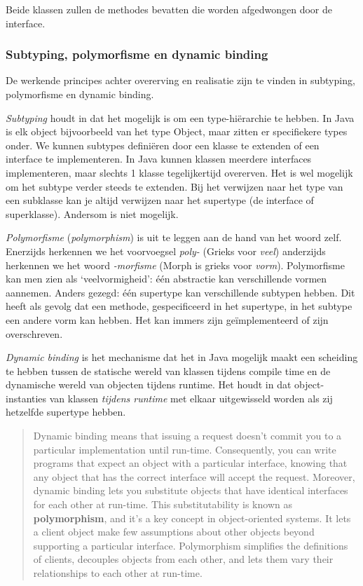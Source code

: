Beide klassen zullen de methodes bevatten die worden afgedwongen door de 
interface.

\subsubsection{Subtyping, polymorfisme en dynamic binding}
De werkende principes achter overerving en realisatie zijn te vinden in 
subtyping, polymorfisme en dynamic binding.

\textit{Subtyping} houdt in dat het mogelijk is om een type-hiërarchie te hebben.
In Java is elk object bijvoorbeeld van het type Object, maar zitten er specifiekere
types onder. We kunnen subtypes definiëren door een klasse te extenden of 
een interface te implementeren. In Java kunnen klassen meerdere interfaces implementeren, 
maar slechts 1 klasse tegelijkertijd overerven. Het is wel mogelijk om het subtype verder 
steeds te extenden. Bij het verwijzen naar het type van een subklasse kan je altijd 
verwijzen naar het supertype (de interface of superklasse). Andersom is niet mogelijk.

\textit{Polymorfisme} (\textit{polymorphism}) is uit te leggen 
aan de hand van het woord zelf. Enerzijds herkennen we
het voorvoegsel \textit{poly-} (Grieks voor \textit{veel})
anderzijds herkennen we het woord \textit{-morfisme} (Morph is grieks voor \textit{vorm}).
Polymorfisme kan men zien als `veelvormigheid': één abstractie kan verschillende vormen aannemen.
Anders gezegd: één supertype kan verschillende subtypen hebben.
Dit heeft als gevolg dat een methode, gespecificeerd in het supertype, 
in het subtype een andere vorm kan hebben. Het kan immers zijn geïmplementeerd of 
zijn overschreven.

\textit{Dynamic binding} is het mechanisme dat het in Java mogelijk maakt
een scheiding te hebben tussen de statische wereld van klassen tijdens compile time 
en de dynamische wereld van objecten tijdens runtime. Het houdt in dat
object-instanties van klassen \textit{tijdens runtime} met elkaar uitgewisseld 
worden als zij hetzelfde supertype hebben.

\blockquote{
Dynamic binding means that issuing a request doesn't commit you to a particular
implementation until run-time. Consequently, you can write programs that expect an
object with a particular interface, knowing that any object that has the correct interface
will accept the request. Moreover, dynamic binding lets you substitute objects that
have identical interfaces for each other at run-time. This substitutability is known as
\textbf{polymorphism}, and it's a key concept in object-oriented systems. It lets a client object
make few assumptions about other objects beyond supporting a particular interface.
Polymorphism simplifies the definitions of clients, decouples objects from each other,
and lets them vary their relationships to each other at run-time.
}{\cite{Gof1994}}

